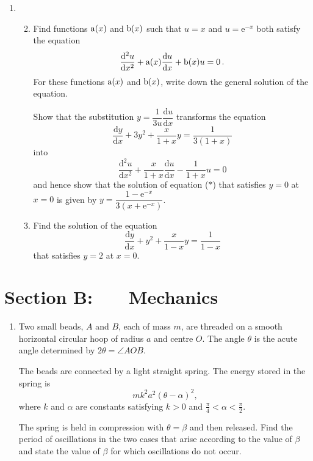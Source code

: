 \documentclass[a4, 11pt]{report}
\newlength{\qspace}
\newcounter{qnumber}
\newenvironment{question}%
 {\vspace{\qspace}
  \begin{enumerate}[\bfseries 1\quad][10]%
    \setcounter{enumi}{\value{qnumber}}%
    \item%
 }
{
  \end{enumerate}
  \filbreak
  \stepcounter{qnumber}
 }
\newenvironment{questionparts}[1][1]%
 {
  \begin{enumerate}[\bfseries (i)]%
    \setcounter{enumii}{#1}
    \addtocounter{enumii}{-1}
    \setlength{\itemsep}{5mm}
    \setlength{\parskip}{8pt}
 }
 {
  \end{enumerate}
 }
\def\d{{\mathrm d}}
\def\e{{\mathrm e}}
\begin{document}
\begin{question}	
\begin{questionparts}
\item Find functions ${\rm a}(x)$ and ${\rm b}(x)$ such that $u=x$ and
  $u=\e^{-x}$
both satisfy the equation 
$$\dfrac{\d^2u}{\d x^2} +{\rm a}(x) \dfrac{\d u}{\d x} + {\rm b} (x)u=0\,.$$ 
For these functions ${\rm a}(x)$ and ${\rm b}(x)$, write 
down the  general solution of the equation.

Show that  the substitution $y= \dfrac 1 {3u} \dfrac {\d u}{\d x}$
transforms the equation
\[
\frac{\d y}{\d x} +3y^2 + \frac {x} {1+x} y = \frac 1 {3(1+x)}
\tag{$*$}
\]
into
\[
\frac{\d^2 u}{\d x^2} +\frac x{1+x} \frac{\d u}{\d x} - \frac 1 {1+x}
u=0
\]
and hence show that the solution of equation ($*$) that satisfies
$y=0$ at $x=0$ is given by
 $y = \dfrac{1-\e^{-x}}{3(x+\e^{-x})}$.

\item
Find the solution of the equation
$$
\frac{\d y}{\d x} +y^2 + \frac x {1-x} y = \frac 1 {1-x}
$$
that satisfies $y=2$ at $x=0$.



\end{questionparts}
\end{question}	
		

		
	
\newpage
\section*{Section B: \ \ \ Mechanics}


	
\begin{question}
Two small beads, $A$ and $B$, each of mass $m$, are threaded  
on a smooth  horizontal circular hoop of radius $a$ and centre $O$. 
The angle $\theta$ is the acute angle determined by
$2\theta = \angle AOB$.

The beads are connected by a light  straight spring. 
The energy 
stored in the spring 
is 
\[
mk^2 a^2(\theta - \alpha)^2,
\]
where 
$k$ and $\alpha$ are constants satisfying 
$k>0$ and $\frac \pi 4< \alpha<\frac\pi2$.


The spring is held in compression with $\theta =\beta$
and then
released.
Find the period of oscillations in the two cases that arise according
to the value of $\beta$ and state the value of $\beta$ for which 
oscillations do not occur.
	\end{question}
	
\end{document}
